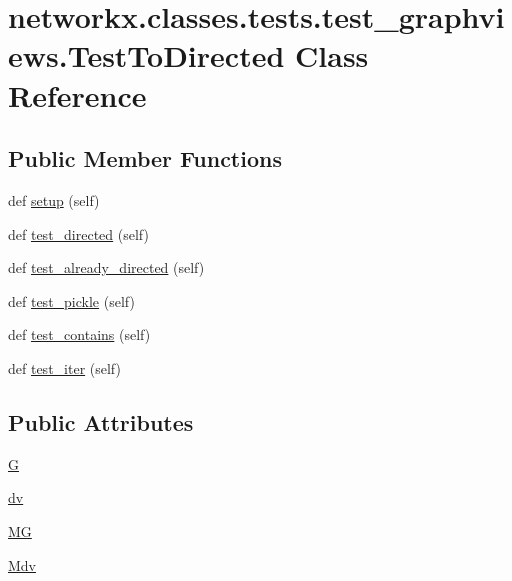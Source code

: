\hypertarget{classnetworkx_1_1classes_1_1tests_1_1test__graphviews_1_1TestToDirected}{}\section{networkx.\+classes.\+tests.\+test\+\_\+graphviews.\+Test\+To\+Directed Class Reference}
\label{classnetworkx_1_1classes_1_1tests_1_1test__graphviews_1_1TestToDirected}
\subsection*{Public Member Functions}
\begin{DoxyCompactItemize}
\item 
def \hyperlink{classnetworkx_1_1classes_1_1tests_1_1test__graphviews_1_1TestToDirected_adf66ab37aa51d393329dc80b0ed89b40}{setup} (self)
\item 
def \hyperlink{classnetworkx_1_1classes_1_1tests_1_1test__graphviews_1_1TestToDirected_a7c39495bb5539748a3d961e5c2e6e679}{test\+\_\+directed} (self)
\item 
def \hyperlink{classnetworkx_1_1classes_1_1tests_1_1test__graphviews_1_1TestToDirected_a5b01e0d0611c501556545b5cf165f365}{test\+\_\+already\+\_\+directed} (self)
\item 
def \hyperlink{classnetworkx_1_1classes_1_1tests_1_1test__graphviews_1_1TestToDirected_a3b50ba216c1252ce6e18a2d7c1370c03}{test\+\_\+pickle} (self)
\item 
def \hyperlink{classnetworkx_1_1classes_1_1tests_1_1test__graphviews_1_1TestToDirected_afcb1a080ded91184865b4bf2a15b543b}{test\+\_\+contains} (self)
\item 
def \hyperlink{classnetworkx_1_1classes_1_1tests_1_1test__graphviews_1_1TestToDirected_aa3ed61156db82ded19faf26eb0a5bb59}{test\+\_\+iter} (self)
\end{DoxyCompactItemize}
\subsection*{Public Attributes}
\begin{DoxyCompactItemize}
\item 
\hyperlink{classnetworkx_1_1classes_1_1tests_1_1test__graphviews_1_1TestToDirected_ac4edfebd98ca06a047f9ece887ef78a0}{G}
\item 
\hyperlink{classnetworkx_1_1classes_1_1tests_1_1test__graphviews_1_1TestToDirected_ac91cc7293b3d6b1ac1027917ecb91a5c}{dv}
\item 
\hyperlink{classnetworkx_1_1classes_1_1tests_1_1test__graphviews_1_1TestToDirected_a8f0d00e2c8e2f69e17d8ffc20ce33dce}{MG}
\item 
\hyperlink{classnetworkx_1_1classes_1_1tests_1_1test__graphviews_1_1TestToDirected_ad2018a1a10028e3d382a6bbaaba4834d}{Mdv}
\end{DoxyCompactItemize}


